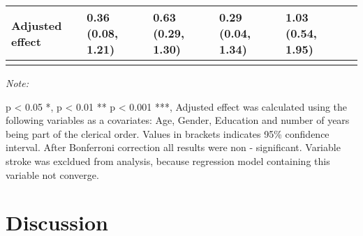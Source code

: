 \documentclass[ijerph,article,accept,moreauthors,pdftex]{mdpi}
\begin{document}
\begin{table}[!h]
{\begin{threeparttable}
\begin{tabular}[t]{llllll}
Adjusted effect & 0.36 (0.08, 1.21) & 0.63 (0.29, 1.30) & 0.29 (0.04, 1.34) & 1.03 (0.54, 1.95) & \\
\bottomrule{}
\end{tabular}
\begin{tablenotes}[para]
\item \textit{Note:} 
\item p < 0.05 *, p < 0.01 ** p < 0.001 ***, Adjusted effect was calculated using the following variables as a covariates: Age, Gender, Education and number of years being part of the clerical order. Values in brackets indicates 95\% confidence interval. After Bonferroni correction all results were non - significant. Variable stroke was excldued from analysis, because regression model containing this variable not converge.
\end{tablenotes}
\end{threeparttable}}
\end{table}

\hypertarget{discussion}{%
\section{Discussion}\label{discussion}}
\end{document}
